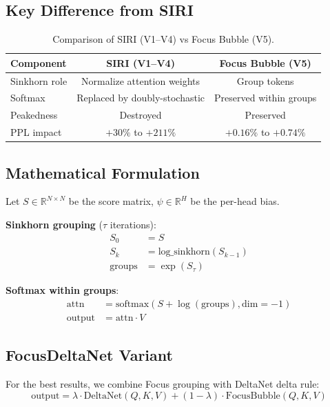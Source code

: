 \documentclass[11pt]{article}
\begin{document}
\subsection{Key Difference from SIRI}

\begin{table}[h]
\centering
\caption{Comparison of SIRI (V1--V4) vs Focus Bubble (V5).}
\label{tab:comparison}
\begin{tabular}{lcc}
\toprule
Component & SIRI (V1--V4) & Focus Bubble (V5) \\
\midrule
Sinkhorn role & Normalize attention weights & Group tokens \\
Softmax & Replaced by doubly-stochastic & Preserved within groups \\
Peakedness & Destroyed & Preserved \\
PPL impact & $+30\%$ to $+211\%$ & $+0.16\%$ to $+0.74\%$ \\
\bottomrule
\end{tabular}
\end{table}

\subsection{Mathematical Formulation}

Let $S \in \mathbb{R}^{N \times N}$ be the score matrix, $\psi \in \mathbb{R}^H$ be the per-head bias.

\textbf{Sinkhorn grouping} ($\tau$ iterations):
\begin{align}
  S_0 &= S \\
  S_k &= \text{log\_sinkhorn}(S_{k-1}) \\
  \text{groups} &= \exp(S_\tau)
\end{align}

\textbf{Softmax within groups}:
\begin{align}
  \text{attn} &= \text{softmax}(S + \log(\text{groups}), \text{dim}=-1) \\
  \text{output} &= \text{attn} \cdot V
\end{align}

\subsection{FocusDeltaNet Variant}

For the best results, we combine Focus grouping with DeltaNet delta rule:
\begin{equation}
  \text{output} = \lambda \cdot \text{DeltaNet}(Q,K,V) + (1-\lambda) \cdot \text{FocusBubble}(Q,K,V)
\end{equation}
\end{document}

